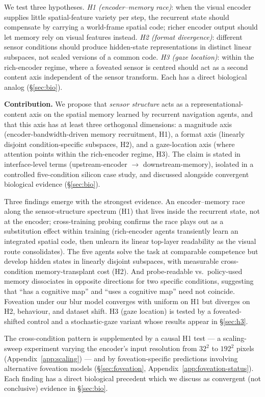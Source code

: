 \documentclass{article}
\newcommand{\hcpending}[1]{{\color{hcpendingcol}#1}}
\begin{document}
We test three hypotheses. \emph{H1 (encoder--memory race)}: when the visual encoder supplies little spatial-feature variety per step, the recurrent state should compensate by carrying a world-frame spatial code; richer encoder output should let memory rely on visual features instead. \emph{H2 (format divergence)}: different sensor conditions should produce hidden-state representations in distinct linear subspaces, not scaled versions of a common code. \emph{H3 (gaze location)}: within the rich-encoder regime, where a foveated sensor is centred should act as a second content axis independent of the sensor transform. Each has a direct biological analog (§\ref{sec:bio}).

\noindent\textbf{Contribution.} We propose that \emph{sensor structure} acts as a representational-content axis on the spatial memory learned by recurrent navigation agents, and that this axis has at least three orthogonal dimensions: a magnitude axis (encoder-bandwidth-driven memory recruitment, H1), a format axis (linearly disjoint condition-specific subspaces, H2), and a gaze-location axis (where attention points within the rich-encoder regime, H3). The claim is stated in interface-level terms (upstream-encoder $\to$ downstream-memory), isolated in a controlled five-condition silicon case study, and discussed alongside convergent biological evidence (§\ref{sec:bio}).

Three findings emerge with the strongest evidence. An encoder--memory race along the sensor-structure spectrum (H1) that lives inside the recurrent state, not at the encoder; cross-training probing confirms the race plays out as a substitution effect within training (rich-encoder agents transiently learn an integrated spatial code, then unlearn its linear top-layer readability as the visual route consolidates). The five agents solve the task at comparable competence but develop hidden states in linearly disjoint subspaces, with measurable cross-condition memory-transplant cost (H2). And probe-readable vs.\ policy-used memory dissociates in opposite directions for two specific conditions, suggesting that ``has a cognitive map'' and ``uses a cognitive map'' need not coincide. Foveation under our blur model converges with uniform on H1 but diverges on H2, behaviour, and dataset shift. H3 (gaze location) is tested by a foveated-shifted control \hcpending{and a stochastic-gaze variant whose results} appear in §\ref{sec:h3}.

The cross-condition pattern is supplemented by a causal H1 test --- a scaling-sweep experiment varying the encoder's input resolution from $32^2$ to $192^2$ pixels (Appendix~\ref{app:scaling}) --- and by foveation-specific predictions involving alternative foveation models (§\ref{sec:foveation}, Appendix~\ref{app:foveation-status}). Each finding has a direct biological precedent which we discuss as convergent (not conclusive) evidence in §\ref{sec:bio}.
\end{document}
